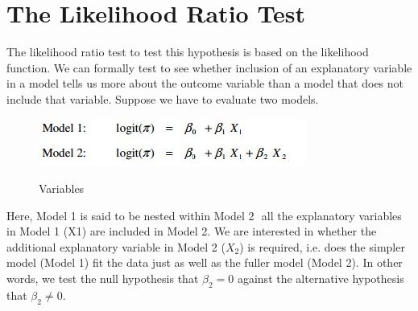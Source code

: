 ﻿\documentclass[a4paper,12pt]{article}
\begin{document}
	
	
\section{The Likelihood Ratio Test}
The likelihood ratio test to test this hypothesis is based on the likelihood
function. We can formally test to see whether inclusion of an explanatory variable in a model tells us
more about the outcome variable than a model that does not include that variable. Suppose
we have to evaluate two models. 

\begin{center}
\begin{figure}[h!]
\includegraphics[scale=0.6]{images/LogWeek10D}\\
\caption{Variables}
\end{figure}
\end{center}
Here, Model 1 is said to be nested within Model 2  all the explanatory variables in Model 1
(X1) are included in Model 2. We are interested in whether the additional explanatory
variable in Model 2 ($X_2$) is required, i.e. does the simpler model (Model 1) fit the data just as
well as the fuller model (Model 2). In other words, we test the null hypothesis that $\beta_2 = 0$
against the alternative hypothesis that $\beta_2 \neq 0$. 
\end{document}
